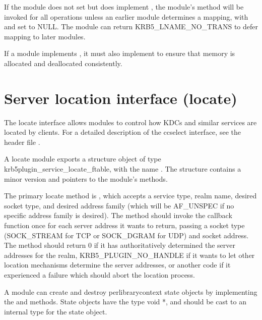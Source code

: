 \documentclass[letterpaper,10pt,english]{sphinxmanual}
\begin{document}
\sphinxAtStartPar
If the module does not set  but does implement
, the module’s  method will be invoked for all
 operations unless an earlier module
determines a mapping, with  and  set to NULL.  The
module can return KRB5\_LNAME\_NO\_TRANS to defer mapping to later
modules.

\sphinxAtStartPar
If a module implements , it must also implement
 to ensure that memory is allocated and deallocated
consistently.

\sphinxstepscope


\section{Server location interface (locate)}
\label{\detokenize{plugindev/locate:server-location-interface-locate}}\label{\detokenize{plugindev/locate::doc}}
\sphinxAtStartPar
The locate interface allows modules to control how KDCs and similar
services are located by clients.  For a detailed description of the
ccselect interface, see the header file .

\sphinxAtStartPar
A locate module exports a structure object of type
krb5plugin\_service\_locate\_ftable, with the name .
The structure contains a minor version and pointers to the module’s
methods.

\sphinxAtStartPar
The primary locate method is , which accepts a service type,
realm name, desired socket type, and desired address family (which
will be AF\_UNSPEC if no specific address family is desired).  The
method should invoke the callback function once for each server
address it wants to return, passing a socket type (SOCK\_STREAM for TCP
or SOCK\_DGRAM for UDP) and socket address.  The  method
should return 0 if it has authoritatively determined the server
addresses for the realm, KRB5\_PLUGIN\_NO\_HANDLE if it wants to let
other location mechanisms determine the server addresses, or another
code if it experienced a failure which should abort the location
process.

\sphinxAtStartPar
A module can create and destroy per\sphinxhyphen{}library\sphinxhyphen{}context state objects by
implementing the  and  methods.  State objects have
the type void *, and should be cast to an internal type for the state
object.
\end{document}
